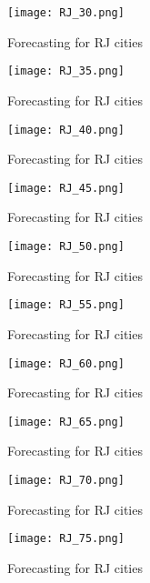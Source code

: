  \begin{figure}[!ht] 
 \centering 
 \texttt{[image: RJ\_30.png]} 
 \caption{Forecasting for RJ cities } 
 \label{fig:RJ_30} 
 \end{figure} 
 
 \begin{figure}[!ht] 
 \centering 
 \texttt{[image: RJ\_35.png]} 
 \caption{Forecasting for RJ cities } 
 \label{fig:RJ_35} 
 \end{figure} 
 
 \begin{figure}[!ht] 
 \centering 
 \texttt{[image: RJ\_40.png]} 
 \caption{Forecasting for RJ cities } 
 \label{fig:RJ_40} 
 \end{figure} 
 
 \begin{figure}[!ht] 
 \centering 
 \texttt{[image: RJ\_45.png]} 
 \caption{Forecasting for RJ cities } 
 \label{fig:RJ_45} 
 \end{figure} 
 
 \begin{figure}[!ht] 
 \centering 
 \texttt{[image: RJ\_50.png]} 
 \caption{Forecasting for RJ cities } 
 \label{fig:RJ_50} 
 \end{figure} 
 
 \begin{figure}[!ht] 
 \centering 
 \texttt{[image: RJ\_55.png]} 
 \caption{Forecasting for RJ cities } 
 \label{fig:RJ_55} 
 \end{figure} 
 
 \begin{figure}[!ht] 
 \centering 
 \texttt{[image: RJ\_60.png]} 
 \caption{Forecasting for RJ cities } 
 \label{fig:RJ_60} 
 \end{figure} 
 
 \begin{figure}[!ht] 
 \centering 
 \texttt{[image: RJ\_65.png]} 
 \caption{Forecasting for RJ cities } 
 \label{fig:RJ_65} 
 \end{figure} 
 
 \begin{figure}[!ht] 
 \centering 
 \texttt{[image: RJ\_70.png]} 
 \caption{Forecasting for RJ cities } 
 \label{fig:RJ_70} 
 \end{figure} 
 
 \begin{figure}[!ht] 
 \centering 
 \texttt{[image: RJ\_75.png]} 
 \caption{Forecasting for RJ cities } 
 \label{fig:RJ_75} 
 \end{figure} 
 
